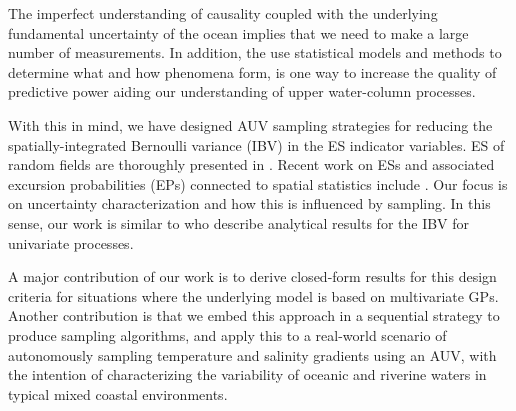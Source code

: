 \documentclass[aoas]{imsart}
\begin{document}



The imperfect understanding of causality coupled with the underlying
fundamental uncertainty of the ocean implies that we need to make a
large number of measurements. In addition, the use statistical models
and methods to determine what and how phenomena form, is one way to
increase the quality of predictive power aiding our understanding of
upper water-column processes. 

With this in mind, we have designed AUV sampling strategies for
reducing the spatially-integrated Bernoulli variance (IBV) in the ES
indicator variables. 
ES of random fields are thoroughly presented in \citep{adler2009random}. Recent work on ESs and associated excursion
probabilities (EPs) connected to spatial statistics include
\cite{french2013spatio,bolin2015excursion,french2016credible}. Our
focus is on uncertainty characterization and how this is influenced by
sampling. In this sense, our work is similar to
\cite{bect2012,chevalier2014fast,azzimonti2016quantifying} who
describe analytical results for the IBV for univariate processes.

A major contribution of our work is to derive closed-form results for
this design criteria for situations where the underlying model is
based on multivariate GPs. Another contribution is that we embed this
approach in a sequential strategy to produce sampling algorithms, and
apply this to a real-world scenario of autonomously sampling
temperature and salinity gradients using an AUV, with the intention of
characterizing the variability of oceanic and riverine waters in
typical mixed coastal environments.
\end{document}
